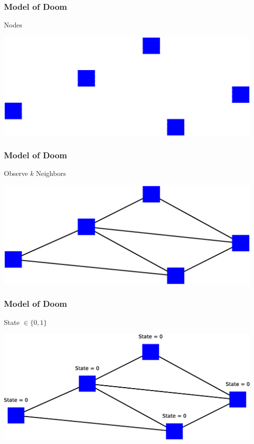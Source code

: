 \begin{frame}
    \frametitle{Model of Doom}
    \begin{itemize}
        \gitem Nodes
    \end{itemize}
    \vspace{10.8pt}
    \includegraphics[width=\textwidth]{img/model1}
    \vfill
\end{frame}

\begin{frame}
    \frametitle{Model of Doom}
    \begin{itemize}
        \gitem Observe $k$ Neighbors
    \end{itemize}
    \vspace{8.6pt}
    \includegraphics[width=\textwidth]{img/model2}
    \vfill
\end{frame}

\begin{frame}
    \frametitle{Model of Doom}
    \begin{itemize}
        \gitem State $\in \lbrace 0, 1 \rbrace$
    \end{itemize}
    \vspace{8pt}
    \includegraphics[width=\textwidth]{img/model3}
    \vfill
\end{frame}

